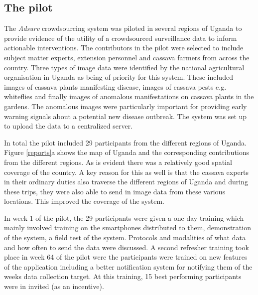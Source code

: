 \documentclass[letterpaper]{article} %
\begin{document}
\subsection{The pilot}
The \emph{Adsurv} crowdsourcing system was piloted in several regions of Uganda to provide evidence of the utility of a crowdsourced surveillance data to inform actionable interventions. The contributors in the pilot were selected to include subject matter experts, extension personnel and cassava farmers from across the country. Three types of image data were identified by the national agricultural organisation in Uganda as being of priority for this system. These included images of cassava plants manifesting disease, images of cassava pests e.g. whiteflies and finally images of anomalous manifestations on cassava plants in the gardens. The anomalous images were particularly important for providing early warning signals about a potential new disease outbreak. The system was set up to upload the data to a centralized server.

In total the pilot included 29 participants from the different regions of Uganda. Figure \ref{reports}a shows the map of Uganda and the corresponding contributions from the different regions. As is evident there was a relatively good spatial coverage of the country. A key reason for this as well is that the cassava experts in their ordinary duties also traverse the different regions of Uganda and during these trips, they were also able to send in image data from these various locations. This improved the coverage of the system.

In week 1 of the pilot, the 29 participants were given a one day training which mainly involved training on the smartphones distributed to them, demonstration of the system, a field test of the system. Protocols and modalities of what data and how often to send the data were discussed. A second refresher training took place in week 64 of the pilot were the participants were trained on new features of the application including a better notification system for notifying them of the weeks data collection target. At this training, 15 best performing participants were in invited (as an incentive).
\end{document}
